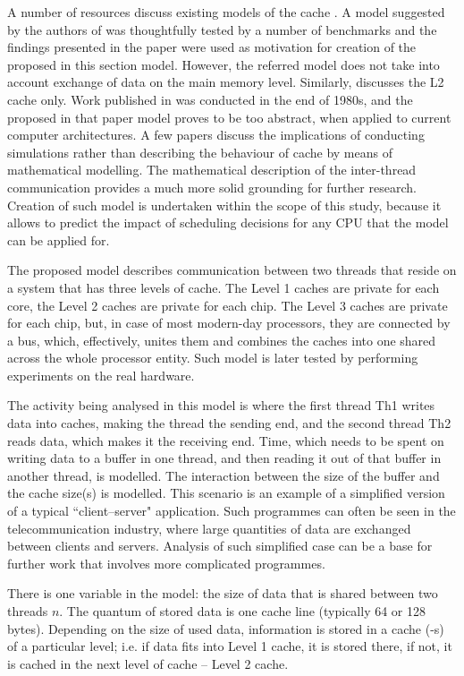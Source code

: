 A number of resources discuss existing models of the cache \cite{ChenDing,Agarwal1989,Song2007}. A model suggested by the authors of \cite{ChenDing} was thoughtfully tested by a number of benchmarks and the findings presented in the paper were used as motivation for creation of the proposed in this section model. However, the referred model does not take into account exchange of data on the main memory level. Similarly, \cite{Song2007} discusses the L2 cache only. Work published in \cite{Agarwal1989} was conducted in the end of 1980s, and the proposed in that paper model proves to be too abstract, when applied to current computer architectures. A few papers discuss the implications of conducting simulations \cite{Heidelberger1990,Archibald1986,Zhao2011} rather than describing the behaviour of cache by means of mathematical modelling. The mathematical description of the inter-thread communication provides a much more solid grounding for further research. Creation of such model is undertaken within the scope of this study, because it allows to predict the impact of scheduling decisions for any CPU that the model can be applied for.

The proposed model describes communication between two threads that reside on a system that has three levels of cache. The Level 1 caches are private for each core, the Level 2 caches are private for each chip. The Level 3 caches are private for each chip, but, in case of most modern-day processors, they are connected by a bus, which, effectively, unites them and combines the caches into one shared across the whole processor entity. Such model is later tested by performing experiments on the real hardware.

The activity being analysed in this model is where the first thread Th1 writes data into caches, making the thread the sending end, and the second thread Th2 reads data, which makes it the receiving end. Time, which needs to be spent on writing data to a buffer in one thread, and then reading it out of that buffer in another thread, is modelled. The interaction between the size of the buffer and the cache size(s) is modelled. This scenario is an example of a simplified version of a typical ``client--server" application. Such programmes can often be seen in the telecommunication industry, where large quantities of data are exchanged between clients and servers. Analysis of such simplified case can be a base for further work that involves more complicated programmes.

There is one variable in the model: the size of data that is shared between two threads $n$. The quantum of stored data is one cache line (typically 64 or 128 bytes). Depending on the size of used data, information is stored in a cache (-s) of a particular level; i.e. if data fits into Level 1 cache, it is stored there, if not, it is cached in the next level of cache -- Level 2 cache.

